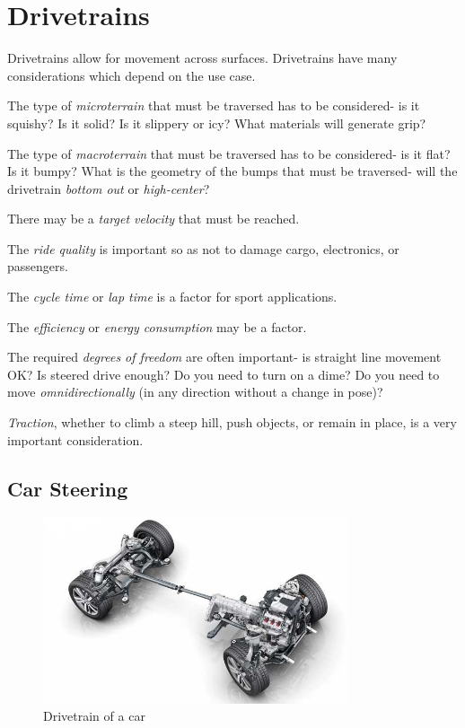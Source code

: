 \section{Drivetrains} \label{sec:drivetrains}
Drivetrains allow for movement across surfaces. Drivetrains have many considerations which depend on the use case.
\begin{asparaenum}[a)]
\item The type of \textit{microterrain} that must be traversed has to be considered- is it squishy? Is it solid? Is it slippery or icy? What materials will generate grip?
\item The type of \textit{macroterrain} that must be traversed has to be considered- is it flat? Is it bumpy? What is the geometry of the bumps that must be traversed- will the drivetrain \textit{bottom out} or \textit{high-center}?
\item There may be a \textit{target velocity} that must be reached.
\item The \textit{ride quality} is important so as not to damage cargo, electronics, or passengers.
\item The \textit{cycle time} or \textit{lap time} is a factor for sport applications.
\item The \textit{efficiency} or \textit{energy consumption} may be a factor.
\item The required \textit{degrees of freedom} are often important- is straight line movement OK? Is steered drive enough? Do you need to turn on a dime? Do you need to move \textit{omnidirectionally} (in any direction without a change in pose)?
\item \textit{Traction}, whether to climb a steep hill, push objects, or remain in place, is a very important consideration.
\end{asparaenum}
\subsection{Car Steering}
\begin{figure}[H]
	\includegraphics[width=0.8\textwidth]{imgs/drivetrain_car.jpeg}
	\caption{Drivetrain of a car}
\end{figure}

